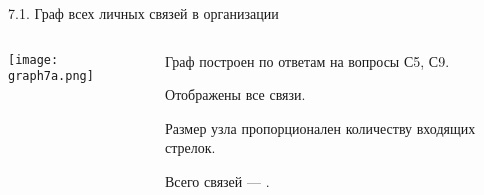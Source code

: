 \begin{frame}{7.1. Граф всех личных связей в организации}

\begin{columns}
\begin{column}{0.75\textwidth} 
\centering
          \texttt{[image: graph7a.png]}
\end{column}
\begin{column}{0.25\textwidth}
\tiny
Граф построен по ответам на вопросы С5, С9.
\smallskip

Отображены все связи. 
\smallskip

Размер узла пропорционален количеству входящих стрелок.
\bigskip

Всего связей --- \valGAlinks.

\end{column}
\end{columns}
\end{frame}


